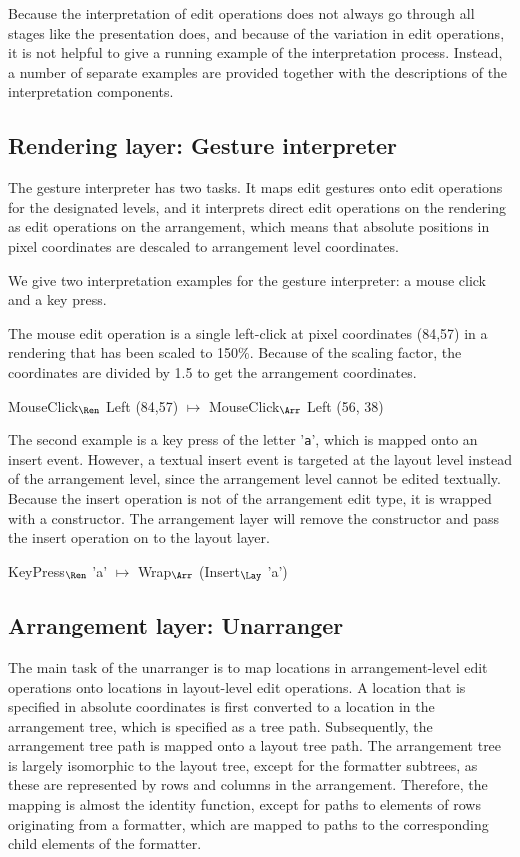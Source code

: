 Because the interpretation of edit operations does not always go through all stages like the presentation does, and because of the variation in edit operations, it is not helpful to give a running example of the interpretation process. Instead, a number of separate examples are provided together with the descriptions of the interpretation components.

%																
\subsection{Rendering layer: Gesture interpreter} \label{sect:gestureInterpreter}

The gesture interpreter has two tasks. It maps edit gestures onto edit operations for the designated levels, and it interprets direct edit operations on the rendering as edit operations on the arrangement, which means that absolute positions in pixel coordinates are descaled to arrangement level coordinates. 

We give two interpretation examples for the gesture interpreter: a mouse click and a key press. 

The mouse edit operation is a single left-click at pixel coordinates (84,57) in a rendering that has been scaled to 150\%.
Because of the scaling factor, the coordinates are divided by 1.5 to get the arrangement coordinates.

\ttfamily
MouseClick$_{\Ren}$ Left (84,57) $\mapsto$ MouseClick$_{\Arr}$ Left (56, 38)\\
\rmfamily

The second example is a key press of the letter '\verb|a|', which is mapped onto an insert event. However, a textual insert event is targeted at the layout level instead of the arrangement level, since the arrangement level cannot be edited textually. Because the insert operation is not of the arrangement edit type, it is wrapped with a  constructor. The arrangement layer will remove the  constructor and pass the insert operation on to the layout layer.

\ttfamily
KeyPress$_{\Ren}$ 'a' $\mapsto$ Wrap$_{\Arr}$ (Insert$_{\Lay}$ 'a')
\rmfamily


%																
\subsection{Arrangement layer: Unarranger}

The main task of the unarranger is to map locations in arrangement-level edit operations onto locations in layout-level edit operations. A location that is specified in absolute coordinates is first converted to a location in the arrangement tree, which is specified as a tree path. Subsequently, the arrangement tree path is mapped onto a layout tree path. The arrangement tree is largely isomorphic to the layout tree, except for the formatter subtrees, as these are represented by rows and columns in the arrangement. Therefore, the mapping is almost the identity function, except for paths to elements of rows originating from a formatter, which are mapped to paths to the corresponding child elements of the formatter.

